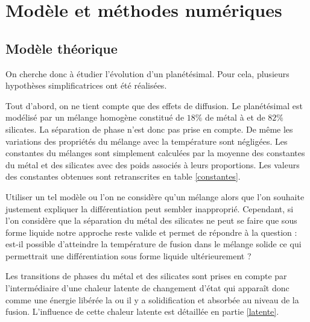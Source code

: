\documentclass[10pt,a4paper]{article}
\numberwithin{equation}{section}
\begin{document}
\section{Modèle et méthodes numériques}
\subsection{Modèle théorique}

On cherche donc à étudier l'évolution d'un planétésimal. Pour cela, plusieurs hypothèses simplificatrices ont été réalisées. 
\medskip

Tout d'abord, on ne tient compte que des effets de diffusion. Le planétésimal est modélisé par un mélange homogène constitué de $18\%$ de métal à et de $82\%$ silicates. La séparation de phase n'est donc pas prise en compte. De même les variations des propriétés du mélange avec la température sont négligées. Les constantes du mélanges sont simplement calculées par la moyenne des constantes du métal et des silicates avec des poids associés à leurs proportions. Les valeurs des constantes obtenues sont retranscrites en table \ref{constantes}.
\medskip

Utiliser un tel modèle ou l'on ne considère qu'un mélange alors que l'on souhaite justement expliquer la différentiation peut sembler inapproprié. Cependant, si l'on considère que la séparation du métal des silicates ne peut se faire que sous forme liquide notre approche reste valide et permet de répondre à la question : est-il possible d'atteindre la température de fusion dans le mélange solide ce qui permettrait une différentiation sous forme liquide ultérieurement ? 
\medskip

Les transitions de phases du métal et des silicates sont prises en compte par l'intermédiaire d'une chaleur latente de changement d'état qui apparaît donc comme une énergie libérée la ou il y a solidification et absorbée au niveau de la fusion. L'influence de cette chaleur latente est détaillée en partie \ref{latente}.
\end{document}
